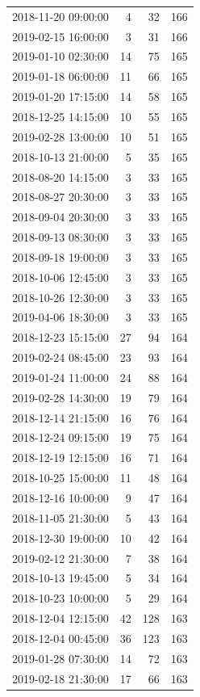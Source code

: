 \begin{tabular}{lrrr}
2018-11-20 09:00:00 & 4 & 32 & 166 \\
2019-02-15 16:00:00 & 3 & 31 & 166 \\
2019-01-10 02:30:00 & 14 & 75 & 165 \\
2019-01-18 06:00:00 & 11 & 66 & 165 \\
2019-01-20 17:15:00 & 14 & 58 & 165 \\
2018-12-25 14:15:00 & 10 & 55 & 165 \\
2019-02-28 13:00:00 & 10 & 51 & 165 \\
2018-10-13 21:00:00 & 5 & 35 & 165 \\
2018-08-20 14:15:00 & 3 & 33 & 165 \\
2018-08-27 20:30:00 & 3 & 33 & 165 \\
2018-09-04 20:30:00 & 3 & 33 & 165 \\
2018-09-13 08:30:00 & 3 & 33 & 165 \\
2018-09-18 19:00:00 & 3 & 33 & 165 \\
2018-10-06 12:45:00 & 3 & 33 & 165 \\
2018-10-26 12:30:00 & 3 & 33 & 165 \\
2019-04-06 18:30:00 & 3 & 33 & 165 \\
2018-12-23 15:15:00 & 27 & 94 & 164 \\
2019-02-24 08:45:00 & 23 & 93 & 164 \\
2019-01-24 11:00:00 & 24 & 88 & 164 \\
2019-02-28 14:30:00 & 19 & 79 & 164 \\
2018-12-14 21:15:00 & 16 & 76 & 164 \\
2018-12-24 09:15:00 & 19 & 75 & 164 \\
2018-12-19 12:15:00 & 16 & 71 & 164 \\
2018-10-25 15:00:00 & 11 & 48 & 164 \\
2018-12-16 10:00:00 & 9 & 47 & 164 \\
2018-11-05 21:30:00 & 5 & 43 & 164 \\
2018-12-30 19:00:00 & 10 & 42 & 164 \\
2019-02-12 21:30:00 & 7 & 38 & 164 \\
2018-10-13 19:45:00 & 5 & 34 & 164 \\
2018-10-23 10:00:00 & 5 & 29 & 164 \\
2018-12-04 12:15:00 & 42 & 128 & 163 \\
2018-12-04 00:45:00 & 36 & 123 & 163 \\
2019-01-28 07:30:00 & 14 & 72 & 163 \\
2019-02-18 21:30:00 & 17 & 66 & 163 \\

\end{tabular}
